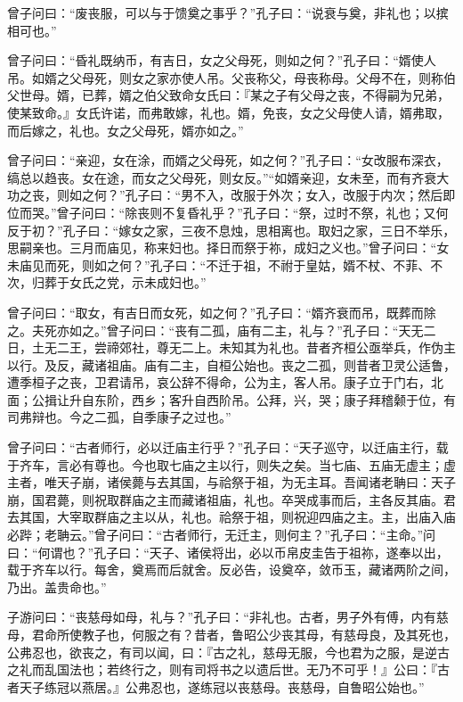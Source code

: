 \documentclass[]{article}
\begin{document}
曾子问曰：``废丧服，可以与于馈奠之事乎？''孔子曰：``说衰与奠，非礼也；以摈相可也。''

曾子问曰：``昏礼既纳币，有吉日，女之父母死，则如之何？''孔子曰：``婿使人吊。如婿之父母死，则女之家亦使人吊。父丧称父，母丧称母。父母不在，则称伯父世母。婿，已葬，婿之伯父致命女氏曰：『某之子有父母之丧，不得嗣为兄弟，使某致命。』女氏许诺，而弗敢嫁，礼也。婿，免丧，女之父母使人请，婿弗取，而后嫁之，礼也。女之父母死，婿亦如之。''

曾子问曰：``亲迎，女在涂，而婿之父母死，如之何？''孔子曰：``女改服布深衣，缟总以趋丧。女在途，而女之父母死，则女反。''``如婿亲迎，女未至，而有齐衰大功之丧，则如之何？''孔子曰：``男不入，改服于外次；女入，改服于内次；然后即位而哭。''曾子问曰：``除丧则不复昏礼乎？''孔子曰：``祭，过时不祭，礼也；又何反于初？''孔子曰：``嫁女之家，三夜不息烛，思相离也。取妇之家，三日不举乐，思嗣亲也。三月而庙见，称来妇也。择日而祭于祢，成妇之义也。''曾子问曰：``女未庙见而死，则如之何？''孔子曰：``不迁于祖，不祔于皇姑，婿不杖、不菲、不次，归葬于女氏之党，示未成妇也。''

曾子问曰：``取女，有吉日而女死，如之何？''孔子曰：``婿齐衰而吊，既葬而除之。夫死亦如之。''曾子问曰：``丧有二孤，庙有二主，礼与？''孔子曰：``天无二日，土无二王，尝禘郊社，尊无二上。未知其为礼也。昔者齐桓公亟举兵，作伪主以行。及反，藏诸祖庙。庙有二主，自桓公始也。丧之二孤，则昔者卫灵公适鲁，遭季桓子之丧，卫君请吊，哀公辞不得命，公为主，客人吊。康子立于门右，北面；公揖让升自东阶，西乡；客升自西阶吊。公拜，兴，哭；康子拜稽颡于位，有司弗辩也。今之二孤，自季康子之过也。''

曾子问曰：``古者师行，必以迁庙主行乎？''孔子曰：``天子巡守，以迁庙主行，载于齐车，言必有尊也。今也取七庙之主以行，则失之矣。当七庙、五庙无虚主；虚主者，唯天子崩，诸侯薨与去其国，与祫祭于祖，为无主耳。吾闻诸老聃曰：天子崩，国君薨，则祝取群庙之主而藏诸祖庙，礼也。卒哭成事而后，主各反其庙。君去其国，大宰取群庙之主以从，礼也。祫祭于祖，则祝迎四庙之主。主，出庙入庙必跸；老聃云。''曾子问曰：``古者师行，无迁主，则何主？''孔子曰：``主命。''问曰：``何谓也？''孔子曰：``天子、诸侯将出，必以币帛皮圭告于祖祢，遂奉以出，载于齐车以行。每舍，奠焉而后就舍。反必告，设奠卒，敛币玉，藏诸两阶之间，乃出。盖贵命也。''

子游问曰：``丧慈母如母，礼与？''孔子曰：``非礼也。古者，男子外有傅，内有慈母，君命所使教子也，何服之有？昔者，鲁昭公少丧其母，有慈母良，及其死也，公弗忍也，欲丧之，有司以闻，曰：『古之礼，慈母无服，今也君为之服，是逆古之礼而乱国法也；若终行之，则有司将书之以遗后世。无乃不可乎！』公曰：『古者天子练冠以燕居。』公弗忍也，遂练冠以丧慈母。丧慈母，自鲁昭公始也。''
\end{document}
